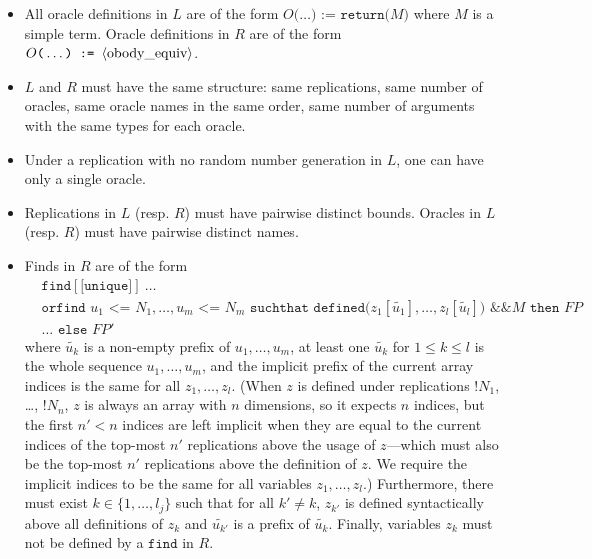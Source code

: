 \begin{itemize}
\begin{itemize}
\item All oracle definitions in $L$ are of the form 
$O\texttt{(}\ldots\texttt{) := return(}M\texttt{)}$
where $M$ is a simple term. %
Oracle definitions in $R$ are of the form 
$O\texttt{(}\ldots\texttt{) := }\langle\textrm{obody\_equiv}\rangle$.

\item $L$ and $R$ must have the same structure: same replications,
same number of oracles, same oracle names in the same order,
same number of arguments with the same types for each oracle.

\item Under a replication with no random number generation in $L$, 
one can have only a single oracle.

\item Replications in $L$ (resp. $R$) must have pairwise distinct
bounds. Oracles in $L$ (resp. $R$) must have pairwise distinct names.

\item %
\newcommand{\tup}[1]{\widetilde{#1}}

Finds in $R$ are of the form
\[\begin{split}
&\texttt{find}[\texttt{[unique]}]\ \ldots\\
&\texttt{orfind }u_1 \texttt{ <= } N_1, \ldots, u_m \texttt{ <= }N_m
\texttt{ suchthat defined(}z_1[\tup{u_1}], \ldots, z_l[\tup{u_l}]\texttt{) \&\& }M\texttt{ then }\mathit{FP}\\
&\ldots \texttt{ else }\mathit{FP}'
\end{split}\]
where $\tup{u_k}$ is a non-empty
prefix of $u_1, \ldots, u_m$, at least one $\tup{u_k}$ for $1 \leq
k \leq l$ is the whole sequence $u_1, \ldots, u_m$,
and the implicit prefix of the current array indices is the same
for all $z_1, \ldots, z_l$.
%
(When $z$ is defined under replications $\texttt{!}N_1$, \ldots,
$\texttt{!}N_n$, $z$ is always an array with $n$ dimensions, so it
expects $n$ indices, but the first $n'<n$ indices are left implicit
when they are equal to the current indices of the top-most $n'$ replications
above the usage of $z$---which must also be the top-most $n'$
replications above the definition of $z$. We require the implicit
indices to be the same for all variables $z_1, \ldots, z_l$.)
Furthermore, there must exist $k \in \{ 1, \ldots, l_j\}$ such that
for all $k' \neq k$, $z_{k'}$ is defined syntactically above all
definitions of $z_k$ and $\tup{u_{k'}}$ is a prefix of $\tup{u_k}$. 
%
Finally, variables $z_k$ must not be defined by a $\texttt{find}$ in $R$.



\end{itemize}
\end{itemize}
